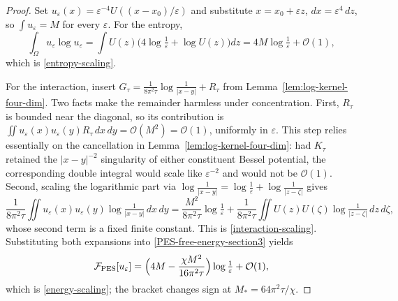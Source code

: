 \documentclass[pdflatex,sn-mathphys-num]{sn-jnl}%
\theoremstyle{thmstyleone}
\theoremstyle{thmstyletwo}
\theoremstyle{thmstylethree}
\begin{document}
\begin{proof}
Set $u_\varepsilon(x)=\varepsilon^{-4}U((x-x_0)/\varepsilon)$ and substitute
$x=x_0+\varepsilon z$, $dx=\varepsilon^4\,dz$, so $\int u_\varepsilon=M$ for
every $\varepsilon$. For the entropy,
\[
   \int_\Omega u_\varepsilon\log u_\varepsilon
   =\int U(z)\bigl(4\log\tfrac1\varepsilon+\log U(z)\bigr)dz
   =4M\log\tfrac1\varepsilon+\mathcal O(1),
\]
which is \eqref{entropy-scaling}.

For the interaction, insert $G_\tau=\tfrac{1}{8\pi^2\tau}\log\frac1{|x-y|}
+R_\tau$ from Lemma~\ref{lem:log-kernel-four-dim}. Two facts make the
remainder harmless under concentration. First, $R_\tau$ is bounded near the
diagonal, so its contribution is
$\iint u_\varepsilon(x)u_\varepsilon(y)R_\tau\,dx\,dy=\mathcal O(M^2)=\mathcal O(1)$, uniformly
in $\varepsilon$. This step relies essentially on the cancellation in
Lemma~\ref{lem:log-kernel-four-dim}: had $K_\tau$ retained the $|x-y|^{-2}$
singularity of either constituent Bessel potential, the corresponding double
integral would scale like $\varepsilon^{-2}$ and would not be $\mathcal O(1)$.
Second, scaling the logarithmic part via
$\log\frac1{|x-y|}=\log\frac1\varepsilon+\log\frac1{|z-\zeta|}$ gives
\[
   \frac{1}{8\pi^2\tau}\iint u_\varepsilon(x)u_\varepsilon(y)
        \log\tfrac1{|x-y|}\,dx\,dy
   =\frac{M^2}{8\pi^2\tau}\log\tfrac1\varepsilon
    +\frac{1}{8\pi^2\tau}\iint U(z)U(\zeta)\log\tfrac1{|z-\zeta|}\,dz\,d\zeta,
\]
whose second term is a fixed finite constant. This is
\eqref{interaction-scaling}. Substituting both expansions into
\eqref{PES-free-energy-section3} yields
\[
   \mathcal F_{\mathrm{PES}}[u_\varepsilon]
   =\Bigl(4M-\frac{\chi M^2}{16\pi^2\tau}\Bigr)\log\tfrac1\varepsilon+\mathcal O(1),
\]
which is \eqref{energy-scaling}; the bracket changes sign at
$M_*=64\pi^2\tau/\chi$.
\end{proof}
\end{document}
